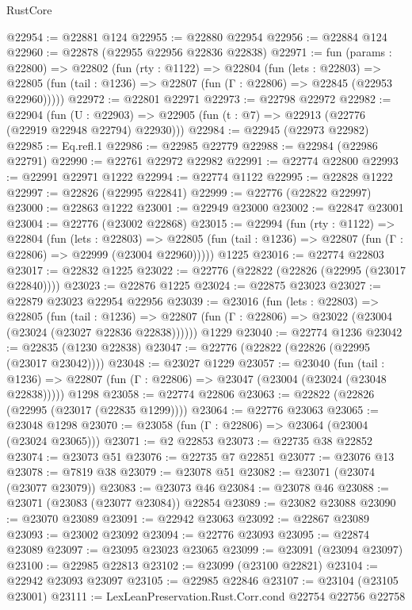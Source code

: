 \begin{lexlean}{RustCore}
\begin{coremodule}
@22954 := @22881 @124
@22955 := @22880 @22954
@22956 := @22884 @124
@22960 := @22878 (@22955 @22956 @22836 @22838)
@22971 := fun (params : @22800) =>
  @22802
    (fun (rty : @1122) =>
    @22804
      (fun (lets : @22803) =>
      @22805 (fun (tail : @1236) => @22807 (fun (Γ : @22806) => @22845 (@22953 @22960)))))
@22972 := @22801 @22971
@22973 := @22798 @22972
@22982 := @22904
    (fun (U : @22903) => @22905 (fun (t : @7) => @22913 (@22776 (@22919 @22948 @22794) @22930)))
@22984 := @22945 (@22973 @22982)
@22985 := Eq.refl.{1}
@22986 := @22985 @22779
@22988 := @22984 (@22986 @22791)
@22990 := @22761 @22972 @22982
@22991 := @22774 @22800
@22993 := @22991 @22971 @1222
@22994 := @22774 @1122
@22995 := @22828 @1222
@22997 := @22826 (@22995 @22841)
@22999 := @22776 (@22822 @22997)
@23000 := @22863 @1222
@23001 := @22949 @23000
@23002 := @22847 @23001
@23004 := @22776 (@23002 @22868)
@23015 := @22994
    (fun (rty : @1122) =>
    @22804
      (fun (lets : @22803) =>
      @22805 (fun (tail : @1236) => @22807 (fun (Γ : @22806) => @22999 (@23004 @22960)))))
    @1225
@23016 := @22774 @22803
@23017 := @22832 @1225
@23022 := @22776 (@22822 (@22826 (@22995 (@23017 @22840))))
@23023 := @22876 @1225
@23024 := @22875 @23023
@23027 := @22879 @23023 @22954 @22956
@23039 := @23016
    (fun (lets : @22803) =>
    @22805
      (fun (tail : @1236) =>
      @22807 (fun (Γ : @22806) => @23022 (@23004 (@23024 (@23027 @22836 @22838))))))
    @1229
@23040 := @22774 @1236
@23042 := @22835 (@1230 @22838)
@23047 := @22776 (@22822 (@22826 (@22995 (@23017 @23042))))
@23048 := @23027 @1229
@23057 := @23040
    (fun (tail : @1236) => @22807 (fun (Γ : @22806) => @23047 (@23004 (@23024 (@23048 @22838)))))
    @1298
@23058 := @22774 @22806
@23063 := @22822 (@22826 (@22995 (@23017 (@22835 @1299))))
@23064 := @22776 @23063
@23065 := @23048 @1298
@23070 := @23058 (fun (Γ : @22806) => @23064 (@23004 (@23024 @23065)))
@23071 := @2 @22853
@23073 := @22735 @38 @22852
@23074 := @23073 @51
@23076 := @22735 @7 @22851
@23077 := @23076 @13
@23078 := @7819 @38
@23079 := @23078 @51
@23082 := @23071 (@23074 (@23077 @23079))
@23083 := @23073 @46
@23084 := @23078 @46
@23088 := @23071 (@23083 (@23077 @23084)) @22854
@23089 := @23082 @23088
@23090 := @23070 @23089
@23091 := @22942 @23063
@23092 := @22867 @23089
@23093 := @23002 @23092
@23094 := @22776 @23093
@23095 := @22874 @23089
@23097 := @23095 @23023 @23065
@23099 := @23091 (@23094 @23097)
@23100 := @22985 @22813
@23102 := @23099 (@23100 @22821)
@23104 := @22942 @23093 @23097
@23105 := @22985 @22846
@23107 := @23104 (@23105 @23001)
@23111 := LexLeanPreservation.Rust.Corr.cond @22754 @22756 @22758

\end{coremodule}
\end{lexlean}
